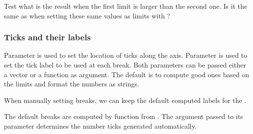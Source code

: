 \documentclass[krantz2]{krantz}\usepackage{knitr}%
\begin{document}
\begin{playground}
Test what is the result when the first limit is larger than the second one. Is it the same as when setting these same values as limits with ?

\begin{knitrout}\footnotesize
{}\color{fgcolor}\begin{kframe}
\begin{alltt}
  \hlopt{+} \hlstd{()} \hlopt{+}
  \hlstd{(} \hlstd{=} \hlstd{(}\hlstd{,} \hlstd{))}
\end{alltt}
\end{kframe}
\end{knitrout}
\end{playground}

\subsubsection{Ticks and their labels}\label{sec:plot:scales:ticks}

Parameter  is used to set the location of ticks along the axis. Parameter  is used to set the tick label to be used at each break. Both parameters can be passed either a vector or a function as argument. The default is to compute good ones based on the limits and format the numbers as strings.

When manually setting breaks, we can keep the default computed labels for the .

\begin{knitrout}\footnotesize
{}\color{fgcolor}\begin{kframe}
\begin{alltt}
  \hlopt{+}
  \hlstd{()} \hlopt{+}
  \hlstd{(} \hlstd{=} \hlstd{(} \hlopt{*} \hlstd{,} \hlstd{,} \hlstd{))}
\end{alltt}
\end{kframe}
\end{knitrout}

The default breaks are computed by function  from . The argument passed to its parameter  determines the number ticks generated automatically.
\end{document}
